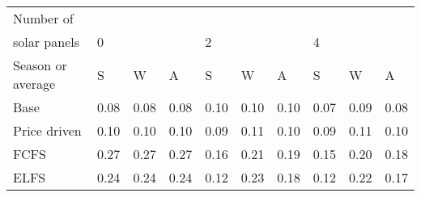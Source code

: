 \begin{table}[h] 
\centering 
\begin{tabular}{l|lll|lll|lll}Number of \\ solar panels&0& & &2& & &4& & \\ \hline 
Season or average & S & W & A & S & W & A & S & W & A \\ \hline 
Base&0.08&0.08&0.08&0.10&0.10&0.10&0.07&0.09&0.08 \\ 
Price driven&0.10&0.10&0.10&0.09&0.11&0.10&0.09&0.11&0.10 \\ 
FCFS&0.27&0.27&0.27&0.16&0.21&0.19&0.15&0.20&0.18 \\ 
ELFS&0.24&0.24&0.24&0.12&0.23&0.18&0.12&0.22&0.17 \\ 
\end{tabular} 
\end{table}